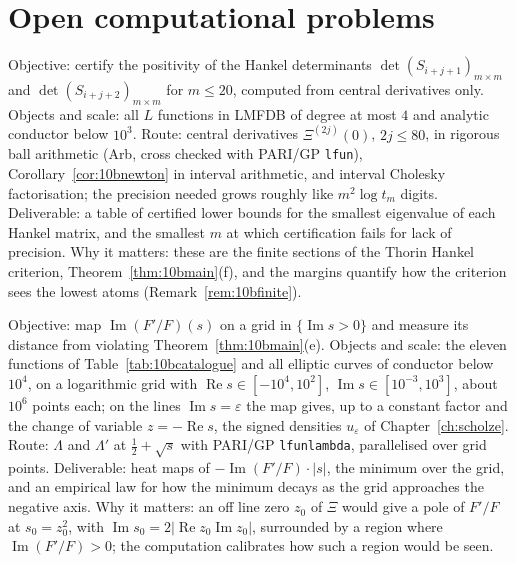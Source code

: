 \section{Open computational problems}

\begin{compproblem}
Objective: certify the positivity of the Hankel determinants $\det(S_{i+j+1})_{m\times m}$ and $\det(S_{i+j+2})_{m\times m}$ for $m\le20$, computed from central derivatives only. Objects and scale: all $L$ functions in LMFDB of degree at most $4$ and analytic conductor below $10^3$. Route: central derivatives $\Xi^{(2j)}(0)$, $2j\le80$, in rigorous ball arithmetic (Arb, cross checked with PARI/GP \texttt{lfun}), Corollary~\ref{cor:10bnewton} in interval arithmetic, and interval Cholesky factorisation; the precision needed grows roughly like $m^2\log t_m$ digits. Deliverable: a table of certified lower bounds for the smallest eigenvalue of each Hankel matrix, and the smallest $m$ at which certification fails for lack of precision. Why it matters: these are the finite sections of the Thorin Hankel criterion, Theorem~\ref{thm:10bmain}(f), and the margins quantify how the criterion sees the lowest atoms (Remark~\ref{rem:10bfinite}).
\end{compproblem}

\begin{compproblem}
Objective: map $\operatorname{Im}(F'/F)(s)$ on a grid in $\{\operatorname{Im}s>0\}$ and measure its distance from violating Theorem~\ref{thm:10bmain}(e). Objects and scale: the eleven functions of Table~\ref{tab:10bcatalogue} and all elliptic curves of conductor below $10^4$, on a logarithmic grid with $\operatorname{Re}s\in[-10^4,10^2]$, $\operatorname{Im}s\in[10^{-3},10^3]$, about $10^6$ points each; on the lines $\operatorname{Im}s=\varepsilon$ the map gives, up to a constant factor and the change of variable $z=-\operatorname{Re}s$, the signed densities $u_\varepsilon$ of Chapter~\ref{ch:scholze}. Route: $\Lambda$ and $\Lambda'$ at $\frac12+\sqrt s$ with PARI/GP \texttt{lfunlambda}, parallelised over grid points. Deliverable: heat maps of $-\operatorname{Im}(F'/F)\cdot|s|$, the minimum over the grid, and an empirical law for how the minimum decays as the grid approaches the negative axis. Why it matters: an off line zero $z_0$ of $\Xi$ would give a pole of $F'/F$ at $s_0 = z_0^2$, with $\operatorname{Im}s_0 = 2|\operatorname{Re}z_0\operatorname{Im}z_0|$, surrounded by a region where $\operatorname{Im}(F'/F)>0$; the computation calibrates how such a region would be seen.
\end{compproblem}

